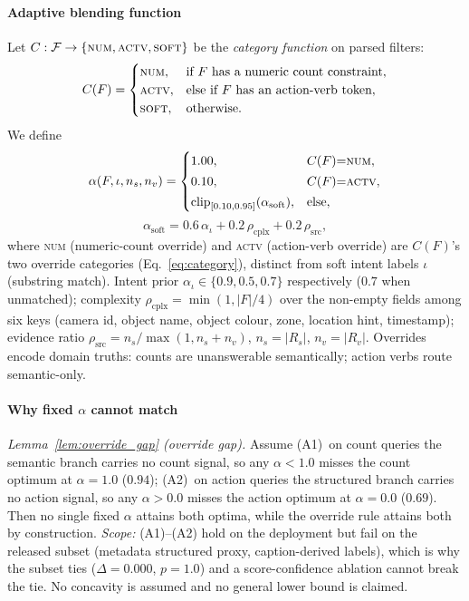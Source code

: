 ﻿\documentclass[conference]{IEEEtran}
\theoremstyle{plain}
\begin{document}
\paragraph*{Adaptive blending function}
Let $C:\mathcal{F}\to\{\textsc{num},\allowbreak \textsc{actv},\allowbreak \textsc{soft}\}$ be the \emph{category function} on parsed filters:
\begin{equation}
C(F) = \begin{cases}
\textsc{num}, & \text{if } F \text{ has a numeric count constraint},\\
\textsc{actv}, & \text{else if } F \text{ has an action-verb token},\\
\textsc{soft}, & \text{otherwise}.
\end{cases}
\label{eq:category}
\end{equation}
We define
\begin{equation}
\alpha(F,\iota,n_s,n_v) =
\begin{cases}
1.00, & C(F){=}\textsc{num}, \\[2pt]
0.10, & C(F){=}\textsc{actv}, \\[2pt]
\mathrm{clip}_{[0.10,0.95]}(\alpha_{\text{soft}}), & \text{else},
\end{cases}
\label{eq:adaptive_alpha}
\end{equation}
\begin{equation}
\alpha_{\text{soft}} = 0.6\,\alpha_\iota + 0.2\,\rho_{\text{cplx}} + 0.2\,\rho_{\text{src}},
\label{eq:alpha_soft}
\end{equation}
where \textsc{num} (numeric-count override) and \textsc{actv} (action-verb override) are $C(F)$'s two override categories (Eq.~\eqref{eq:category}), distinct from soft intent labels $\iota$ (substring match). Intent prior $\alpha_\iota\in\{0.9,\allowbreak 0.5,\allowbreak 0.7\}$ respectively ($0.7$ when unmatched); complexity $\rho_{\text{cplx}}=\min(1,|F|/4)$ over the non-empty fields among six keys (camera id, object name, object colour, zone, location hint, timestamp); evidence ratio $\rho_{\text{src}}=n_s/\max(1,n_s+n_v)$, $n_s=|R_s|$, $n_v=|R_v|$. Overrides encode domain truths: counts are unanswerable semantically; action verbs route semantic-only.

\paragraph*{Why fixed \texorpdfstring{$\alpha$}{alpha} cannot match}
\label{lem:override_gap}\emph{Lemma~\ref{lem:override_gap} (override gap).} Assume (A1)~on count queries the semantic branch carries no count signal, so any $\alpha{<}1.0$ misses the count optimum at $\alpha{=}1.0$ ($0.94$); (A2)~on action queries the structured branch carries no action signal, so any $\alpha{>}0.0$ misses the action optimum at $\alpha{=}0.0$ ($0.69$). Then no single fixed $\alpha$ attains both optima, while the override rule attains both by construction. \emph{Scope:} (A1)--(A2) hold on the deployment but fail on the released subset (metadata structured proxy, caption-derived labels), which is why the subset ties ($\Delta{=}0.000$, $p{=}1.0$) and a score-confidence ablation cannot break the tie. No concavity is assumed and no general lower bound is claimed.
\end{document}
